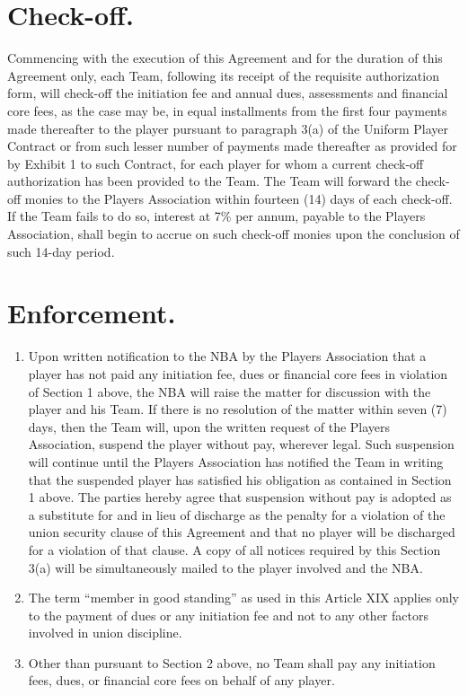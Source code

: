 \documentclass[
]{book}
\providecommand{\tightlist}{%
  \setlength{\itemsep}{0pt}\setlength{\parskip}{0pt}}
\begin{document}
\hypertarget{check-off.}{%
\section{Check-off.}\label{check-off.}}

Commencing with the execution of this Agreement and for the duration of this Agreement only, each Team, following its receipt of the requisite authorization form, will check-off the initiation fee and annual dues, assessments and financial core fees, as the case may be, in equal installments from the first four payments made thereafter to the player pursuant to paragraph 3(a) of the Uniform Player Contract or from such lesser number of payments made thereafter as provided for by Exhibit 1 to such Contract, for each player for whom a current check-off authorization has been provided to the Team. The Team will forward the check-off monies to the Players Association within fourteen (14) days of each check-off. If the Team fails to do so, interest at 7\% per annum, payable to the Players Association, shall begin to accrue on such check-off monies upon the conclusion of such 14-day period.

\hypertarget{enforcement.}{%
\section{Enforcement.}\label{enforcement.}}

\begin{enumerate}
\def\labelenumi{(\alph{enumi})}
\tightlist
\item
  Upon written notification to the NBA by the Players Association that a player has not paid any initiation fee, dues or financial core fees in violation of Section 1 above, the NBA will raise the matter for discussion with the player and his Team. If there is no resolution of the matter within seven (7) days, then the Team will, upon the written request of the Players Association, suspend the player without pay, wherever legal. Such suspension will continue until the Players Association has notified the Team in writing that the suspended player has satisfied his obligation as contained in Section 1 above. The parties hereby agree that suspension without pay is adopted as a substitute for and in lieu of discharge as the penalty for a violation of the union security clause of this Agreement and that no player will be discharged for a violation of that clause. A copy of all notices required by this Section 3(a) will be simultaneously mailed to the player involved and the NBA.
\item
  The term ``member in good standing'' as used in this Article XIX applies only to the payment of dues or any initiation fee and not to any other factors involved in union discipline.
\item
  Other than pursuant to Section 2 above, no Team shall pay any initiation fees, dues, or financial core fees on behalf of any player.
\end{enumerate}
\end{document}
